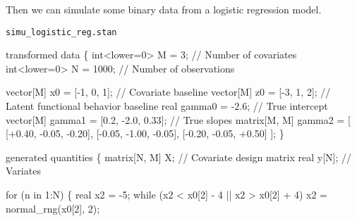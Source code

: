 \documentclass[
  letterpaper,
  DIV=11,
  numbers=noendperiod]{scrartcl}
\newenvironment{Shaded}{\begin{snugshade}}{\end{snugshade}}
\newcommand{\CommentTok}[1]{\textcolor[rgb]{0.37,0.37,0.37}{#1}}
\newcommand{\ControlFlowTok}[1]{\textcolor[rgb]{0.00,0.23,0.31}{#1}}
\newcommand{\DataTypeTok}[1]{\textcolor[rgb]{0.68,0.00,0.00}{#1}}
\newcommand{\DecValTok}[1]{\textcolor[rgb]{0.68,0.00,0.00}{#1}}
\newcommand{\FloatTok}[1]{\textcolor[rgb]{0.68,0.00,0.00}{#1}}
\newcommand{\KeywordTok}[1]{\textcolor[rgb]{0.00,0.23,0.31}{#1}}
\newcommand{\NormalTok}[1]{\textcolor[rgb]{0.00,0.23,0.31}{#1}}
\begin{document}
Then we can simulate some binary data from a logistic regression model.

\begin{codelisting}

\caption{\texttt{simu\_logistic\_reg.stan}}

\begin{Shaded}
\begin{Highlighting}[]
\KeywordTok{transformed data}\NormalTok{ \{}
  \DataTypeTok{int}\NormalTok{\textless{}}\KeywordTok{lower}\NormalTok{=}\DecValTok{0}\NormalTok{\textgreater{} M = }\DecValTok{3}\NormalTok{;         }\CommentTok{// Number of covariates}
  \DataTypeTok{int}\NormalTok{\textless{}}\KeywordTok{lower}\NormalTok{=}\DecValTok{0}\NormalTok{\textgreater{} N = }\DecValTok{1000}\NormalTok{;      }\CommentTok{// Number of observations}
  
  \DataTypeTok{vector}\NormalTok{[M] x0 = [{-}}\DecValTok{1}\NormalTok{, }\DecValTok{0}\NormalTok{, }\DecValTok{1}\NormalTok{]\textquotesingle{}; }\CommentTok{// Covariate baseline}
  \DataTypeTok{vector}\NormalTok{[M] z0 = [{-}}\DecValTok{3}\NormalTok{, }\DecValTok{1}\NormalTok{, }\DecValTok{2}\NormalTok{]\textquotesingle{}; }\CommentTok{// Latent functional behavior baseline}
  \DataTypeTok{real}\NormalTok{ gamma0 = {-}}\FloatTok{2.6}\NormalTok{;                      }\CommentTok{// True intercept}
  \DataTypeTok{vector}\NormalTok{[M] gamma1 = [}\FloatTok{0.2}\NormalTok{, {-}}\FloatTok{2.0}\NormalTok{, }\FloatTok{0.33}\NormalTok{]\textquotesingle{};   }\CommentTok{// True slopes}
  \DataTypeTok{matrix}\NormalTok{[M, M] gamma2 = [ [+}\FloatTok{0.40}\NormalTok{, {-}}\FloatTok{0.05}\NormalTok{, {-}}\FloatTok{0.20}\NormalTok{],}
\NormalTok{                          [{-}}\FloatTok{0.05}\NormalTok{, {-}}\FloatTok{1.00}\NormalTok{, {-}}\FloatTok{0.05}\NormalTok{],}
\NormalTok{                          [{-}}\FloatTok{0.20}\NormalTok{, {-}}\FloatTok{0.05}\NormalTok{, +}\FloatTok{0.50}\NormalTok{] ];}
\NormalTok{\}}

\KeywordTok{generated quantities}\NormalTok{ \{}
  \DataTypeTok{matrix}\NormalTok{[N, M] X; }\CommentTok{// Covariate design matrix}
  \DataTypeTok{real}\NormalTok{ y[N];      }\CommentTok{// Variates}

  \ControlFlowTok{for}\NormalTok{ (n }\ControlFlowTok{in} \DecValTok{1}\NormalTok{:N) \{}
    \DataTypeTok{real}\NormalTok{ x2 = {-}}\DecValTok{5}\NormalTok{;}
    \ControlFlowTok{while}\NormalTok{ (x2 \textless{} x0[}\DecValTok{2}\NormalTok{] {-} }\DecValTok{4}\NormalTok{ || x2 \textgreater{} x0[}\DecValTok{2}\NormalTok{] + }\DecValTok{4}\NormalTok{)}
\NormalTok{      x2 = normal\_rng(x0[}\DecValTok{2}\NormalTok{], }\DecValTok{2}\NormalTok{);}
    

\end{Highlighting}
\end{Shaded}
\end{codelisting}
\end{document}
